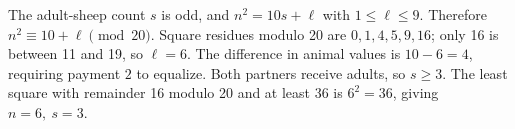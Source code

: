 The adult-sheep count $s$ is odd, and $n^2=10s+\ell$ with $1\le\ell\le9$. Therefore $n^2\equiv10+\ell\pmod{20}$. Square residues modulo 20 are $0,1,4,5,9,16$; only 16 is between 11 and 19, so $\ell=6$. The difference in animal values is $10-6=4$, requiring payment $\boxed2$ to equalize. Both partners receive adults, so $s\ge3$. The least square with remainder 16 modulo 20 and at least 36 is $6^2=36$, giving $\boxed{n=6,\ s=3}$.
